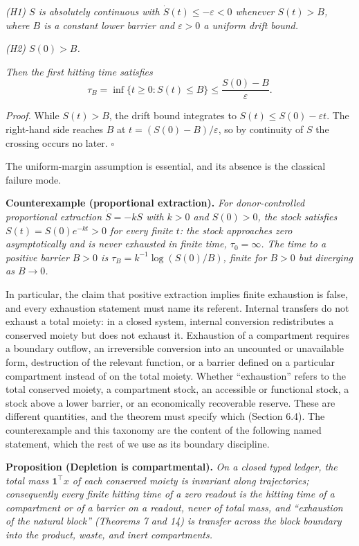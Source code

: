 \documentclass[11pt]{article}
\begin{document}
\emph{(H1) \(S\) is absolutely continuous with
\(\dot S(t) \le -\varepsilon < 0\) whenever \(S(t) > B\), where \(B\) is
a constant lower barrier and \(\varepsilon > 0\) a uniform drift bound.}

\emph{(H2) \(S(0) > B\).}

\emph{Then the first hitting time satisfies}
\[\tau_B = \inf\{ t \ge 0 : S(t) \le B \} \le \frac{S(0) - B}{\varepsilon}.\]

\emph{Proof.} While \(S(t) > B\), the drift bound integrates to \(S(t) \le S(0) - \varepsilon t\). The right-hand side reaches \(B\) at \(t = (S(0) - B)/\varepsilon\), so by continuity of \(S\) the crossing occurs no later. \ensuremath{\square}

The uniform-margin assumption is essential, and its absence is the
classical failure mode.

\textbf{Counterexample (proportional extraction).} \emph{For
donor-controlled proportional extraction \(\dot S = -kS\) with \(k > 0\)
and \(S(0) > 0\), the stock satisfies \(S(t) = S(0)e^{-kt} > 0\) for
every finite \(t\): the stock approaches zero asymptotically and is
never exhausted in finite time, \(\tau_0 = \infty\). The time to a
positive barrier \(B > 0\) is \(\tau_B = k^{-1}\log(S(0)/B)\), finite
for \(B > 0\) but diverging as \(B \to 0\).}

In particular, the claim that positive extraction implies finite exhaustion is false, and every exhaustion statement must name its referent. Internal transfers do not exhaust a total moiety: in a closed system, internal conversion redistributes a conserved moiety but does not exhaust it. Exhaustion of a compartment requires a boundary outflow, an irreversible conversion into an uncounted or unavailable form, destruction of the relevant function, or a barrier defined on a particular compartment instead of on the total moiety. Whether ``exhaustion'' refers to the total conserved moiety, a compartment stock, an accessible or functional stock, a stock above a lower barrier, or an economically recoverable reserve. These are different quantities, and the theorem must specify which (Section 6.4). The counterexample and this taxonomy are the content of the following named statement, which the rest of we use as its boundary discipline.

\textbf{Proposition (Depletion is compartmental).} \emph{On a closed
typed ledger, the total mass \(\mathbf{1}^\top x\) of each conserved
moiety is invariant along trajectories; consequently every finite
hitting time of a zero readout is the hitting time of a compartment or
of a barrier on a readout, never of total mass, and ``exhaustion of the
natural block'' (Theorems 7 and 14) is transfer across the block
boundary into the product, waste, and inert compartments.}
\end{document}
